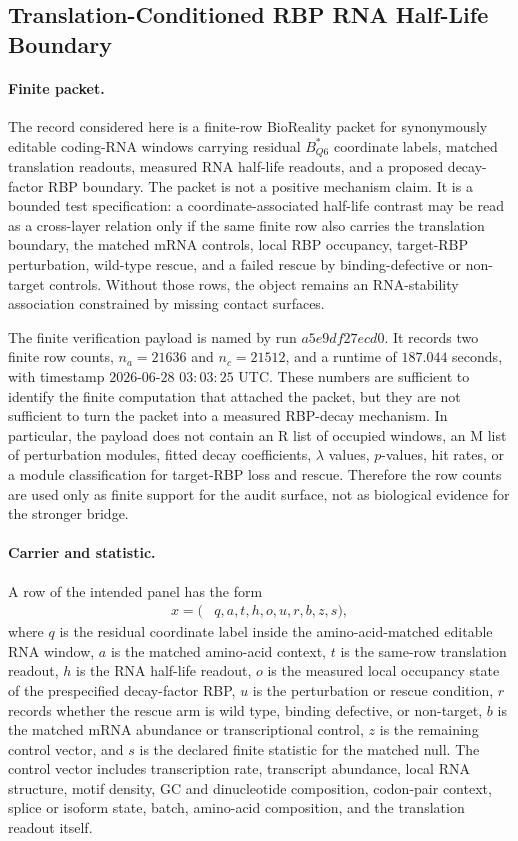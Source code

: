 \subsection{Translation-Conditioned RBP RNA Half-Life Boundary}\label{subsec:bioreality-q6-rbp-rna-half-life-boundary}

\paragraph{Finite packet.}
The record considered here is a finite-row BioReality packet for synonymously editable coding-RNA windows carrying residual $B^{*}_{Q6}$ coordinate labels, matched translation readouts, measured RNA half-life readouts, and a proposed decay-factor RBP boundary.  The packet is not a positive mechanism claim.  It is a bounded test specification: a coordinate-associated half-life contrast may be read as a cross-layer relation only if the same finite row also carries the translation boundary, the matched mRNA controls, local RBP occupancy, target-RBP perturbation, wild-type rescue, and a failed rescue by binding-defective or non-target controls.  Without those rows, the object remains an RNA-stability association constrained by missing contact surfaces.

The finite verification payload is named by run $a5e9df27ecd0$.  It records two finite row counts, $n_a=21636$ and $n_c=21512$, and a runtime of $187.044$ seconds, with timestamp $2026$-$06$-$28$ $03{:}03{:}25$ UTC.  These numbers are sufficient to identify the finite computation that attached the packet, but they are not sufficient to turn the packet into a measured RBP-decay mechanism.  In particular, the payload does not contain an R list of occupied windows, an M list of perturbation modules, fitted decay coefficients, $\lambda$ values, $p$-values, hit rates, or a module classification for target-RBP loss and rescue.  Therefore the row counts are used only as finite support for the audit surface, not as biological evidence for the stronger bridge.

\paragraph{Carrier and statistic.}
A row of the intended panel has the form
$$
\begin{aligned}
  x = (&q, a, t, h, o, u, r, b, z, s),
\end{aligned}
$$
where $q$ is the residual coordinate label inside the amino-acid-matched editable RNA window, $a$ is the matched amino-acid context, $t$ is the same-row translation readout, $h$ is the RNA half-life readout, $o$ is the measured local occupancy state of the prespecified decay-factor RBP, $u$ is the perturbation or rescue condition, $r$ records whether the rescue arm is wild type, binding defective, or non-target, $b$ is the matched mRNA abundance or transcriptional control, $z$ is the remaining control vector, and $s$ is the declared finite statistic for the matched null.  The control vector includes transcription rate, transcript abundance, local RNA structure, motif density, GC and dinucleotide composition, codon-pair context, splice or isoform state, batch, amino-acid composition, and the translation readout itself.

